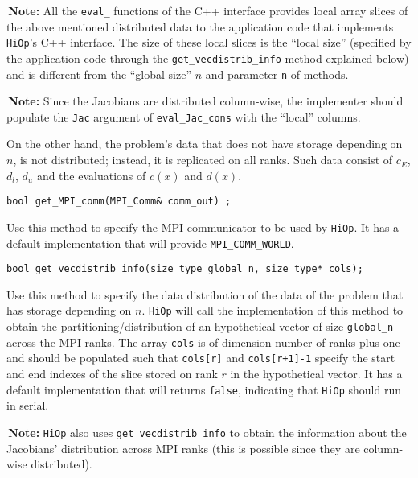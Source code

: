 \documentclass[11pt]{article}
\newcommand{\warningSymbol}{\raisebox{0.9\depth}{\danger}}
\newcommand{\warningcp}[1]{%
        \smallskip \noindent \textcolor{warningColorText}{\warningSymbol{}}\,\textbf{#1} %
    }
\newcommand{\Hi}{\texttt{HiOp}\xspace}
\begin{document}
\warningcp{Note:} All the \texttt{eval\_} functions of the C++ interface provides local array slices of the above mentioned distributed data to the application code that implements \Hi's C++ interface. The size of these local slices is the ``local size'' (specified by the application code through the \texttt{get\_vecdistrib\_info} method explained below) and is different from the ``global size'' $n$ and parameter \texttt{n} of methods. 

\warningcp{Note:} Since the Jacobians are distributed column-wise, the implementer should populate the \texttt{Jac} argument of \texttt{eval\_Jac\_cons} with the ``local'' columns.

On the other hand, the problem's data that does not have storage depending on $n$, is not distributed; instead, it is replicated on all ranks. Such data consist of $c_E$, $d_l$, $d_u$ and the evaluations of $c(x)$ and $d(x)$.
 
\begin{lstlisting} 
bool get_MPI_comm(MPI_Comm& comm_out) ;
\end{lstlisting}

\noindent Use this method to specify the MPI communicator to be used by \Hi. It has a default implementation that will provide \texttt{MPI\_COMM\_WORLD}.


\begin{lstlisting}
bool get_vecdistrib_info(size_type global_n, size_type* cols);
\end{lstlisting}

\noindent Use this method to specify the data distribution of the data of the problem that has storage depending on $n$. \Hi will call the implementation of this method to obtain the partitioning/distribution of an hypothetical vector of size \texttt{global\_n} across the MPI ranks. The array \texttt{cols} is of dimension number of ranks plus one and should be populated such that \texttt{cols[r]} and \texttt{cols[r+1]-1} specify the start and end indexes of the slice stored on rank $r$ in the hypothetical vector.  It has a default implementation that will returns \texttt{false}, indicating that \Hi should run in serial.


\warningcp{Note:}  \Hi also uses \texttt{get\_vecdistrib\_info} to obtain the information about the Jacobians' distribution across MPI ranks (this is possible since they are  column-wise distributed).
\end{document}
